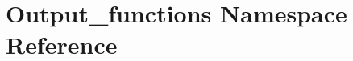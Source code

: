 \hypertarget{namespaceOutput__functions}{}\section{Output\+\_\+functions Namespace Reference}
\label{namespaceOutput__functions}
